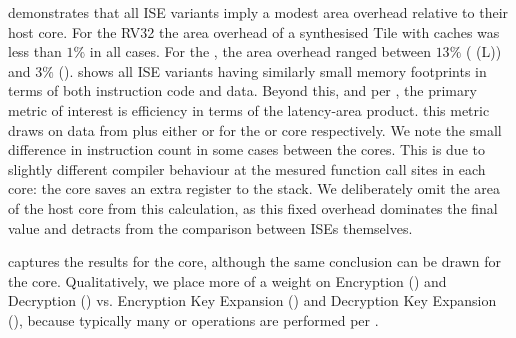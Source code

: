 
demonstrates that all ISE variants
imply a modest area overhead relative to their host core.
For the RV32  the area overhead of a synthesised  Tile with
caches was less than $1\%$ in all cases.
For the , the area overhead ranged between
$13\%$ ( (L))
and
$3\%$ ().
shows all ISE variants
having similarly small memory footprints in terms of both instruction code and
data.
Beyond this, and per 
,
the primary metric of interest is efficiency in terms of
the latency-area product.
this metric draws on data from
plus either
or
for the  or  core respectively.
We note the small difference in instruction count in some cases between the
cores.
This is due to slightly different compiler behaviour at the mesured
function call sites in each core: the  core saves an extra
register to the stack.
We deliberately omit the area of the host core from this calculation, as this
fixed overhead dominates the final value and detracts from the comparison
between ISEs themselves.

captures the results for the  core, although the same conclusion can 
be drawn for the  core.  Qualitatively, we place more of a weight on 
Encryption ()
and 
Decryption ()
vs.
Encryption Key Expansion ()
and 
Decryption Key Expansion (),
because
typically many  or  operations are performed per
.

